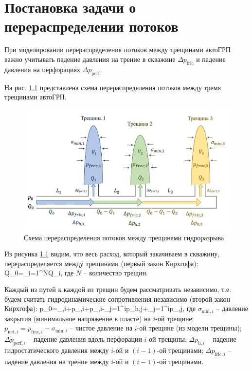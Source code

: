 \chapter{Постановка задачи о перераспределении потоков} \label{ch1}

При моделировании перераспределения потоков между трещинами автоГРП важно учитывать падение давления на трение в скважине $\Delta p_{\text{fric}}$ и падение давления на перфорациях $\Delta p_{\text{perf}}$.

На рис. \ref{fig:flow_distribution_scheme} представлена схема перераспределения потоков между тремя трещинами автоГРП.

\begin{figure}[H] 
\center
\includegraphics[width=0.9\linewidth]{images/flow_distribution_scheme.jpg}
\caption{Схема перераспределения потоков между трещинами гидроразрыва} 
\label{fig:flow_distribution_scheme}  
\end{figure}

Из рисунка \ref{fig:flow_distribution_scheme} видим, что весь расход, который закачиваем в скважину, перераспределяется между трещинами (первый закон Кирхгофа):
\beq\label{1_1}
Q_0=\sum\limits_{i=1}^{N}Q_i,
\eeq
где $N$ -- количество трещин.

Каждый из путей к каждой из трещин будем рассматривать независимо, т.е. будем считать гидродинамические сопротивления независимо (второй закон Кирхгофа):
\beq\label{1_2}
p_0=\sigma_{,i}+p_{,i}+\Delta p_{,i}-\sum_{j=1}^{i}{\Delta p_{h,j}}+\sum_{j=1}^{i}\Delta p_{,j},
\eeq
где $\sigma_{\text{min},i}$ -- давление закрытия (минимальное напряжение в пласте) на $i$-ой трещине;\newline
$p_{\text{net},i}=p_{\text{frac},i}-\sigma_{\text{min},i}$ -- чистое давление на $i$-ой трещине (из модели трещины);\newline
$\Delta p_{\text{perf},i}$ -- падение давления вдоль перфорации $i$-ой трещины;\newline
$\Delta p_{\text{h},i}$ -- падение гидростатического давления между $i$-ой и $(i-1)$-ой трещинами;\newline
$\Delta p_{\text{fric},i}$ -- падение давления на трение между $i$-ой и $(i-1)$-ой трещинами.


